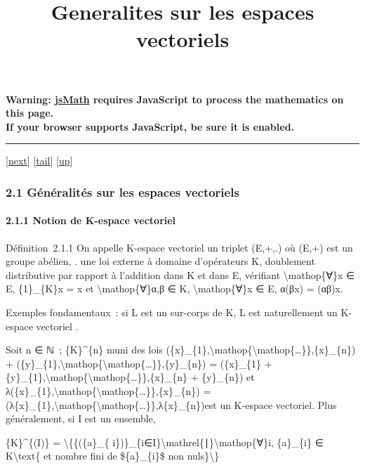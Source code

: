 \documentclass[]{article}
\title{Generalites sur les espaces vectoriels}
\author{}
\date{}
\begin{document}
\maketitle

\textbf{Warning: \href{http://www.math.union.edu/locate/jsMath}{jsMath}
requires JavaScript to process the mathematics on this page.\\ If your
browser supports JavaScript, be sure it is enabled.}

\begin{center}\rule{3in}{0.4pt}\end{center}

{[}\href{coursse8.html}{next}{]}
{[}\hyperref[tailcoursse7.html]{tail}{]}
{[}\href{coursch3.html\#coursse7.html}{up}{]}

\subsubsection{2.1 Généralités sur les espaces vectoriels}

\paragraph{2.1.1 Notion de K-espace vectoriel}

Définition~2.1.1 On appelle K-espace vectoriel un triplet (E,+,.) où
(E,+) est un groupe abélien, . une loi externe à domaine d'opérateurs K,
doublement distributive par rapport à l'addition dans K et dans E,
vérifiant \textbackslash{}mathop\{∀\}x ∈ E, \{1\}\_\{K\}x = x et
\textbackslash{}mathop\{∀\}α,β ∈ K, \textbackslash{}mathop\{∀\}x ∈ E,
α(βx) = (αβ)x.

Exemples fondamentaux~: si L est un sur-corps de K, L est naturellement
un K-espace vectoriel .

Soit n ∈ ℕ~; \{K\}\^{}\{n\} muni des lois
(\{x\}\_\{1\},\textbackslash{}mathop\{\textbackslash{}mathop\{\ldots{}\}\},\{x\}\_\{n\})
+
(\{y\}\_\{1\},\textbackslash{}mathop\{\textbackslash{}mathop\{\ldots{}\}\},\{y\}\_\{n\})
= (\{x\}\_\{1\} +
\{y\}\_\{1\},\textbackslash{}mathop\{\textbackslash{}mathop\{\ldots{}\}\},\{x\}\_\{n\}
+ \{y\}\_\{n\}) et
λ(\{x\}\_\{1\},\textbackslash{}mathop\{\textbackslash{}mathop\{\ldots{}\}\},\{x\}\_\{n\})
=
(λ\{x\}\_\{1\},\textbackslash{}mathop\{\textbackslash{}mathop\{\ldots{}\}\},λ\{x\}\_\{n\})est
un K-espace vectoriel. Plus généralement, si I est un ensemble,

\{K\}\^{}\{(I)\} = \textbackslash{}\{\{(\{a\}\_\{
i\})\}\_\{i∈I\}\textbackslash{}mathrel\{∣\}\textbackslash{}mathop\{∀\}i,
\{a\}\_\{i\} ∈ K\textbackslash{}text\{ et nombre fini de
\$\{a\}\_\{i\}\$ non nuls\}\textbackslash{}\}
\end{document}
